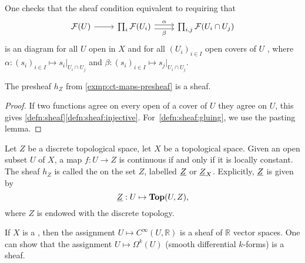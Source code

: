 \begin{rmk}\label{rmk:sheafs-as-equalizers}
    One checks that the sheaf condition equivalent to requiring that
\[\begin{tikzcd}
	{\mathcal{F}(U)} & {\prod_i\mathcal{F}(U_i)} & {\prod_{i,j}\mathcal{F}(U_i \cap U_j)}
	\arrow[from=1-1, to=1-2]
	\arrow["\alpha", shift left, from=1-2, to=1-3]
	\arrow["\beta"', shift right, from=1-2, to=1-3]
\end{tikzcd}\]
    is an  diagram for all $U$ open in $X$ and for all $(U_i)_{i \in I}$ open covers of $U$ , where $\alpha: (s_i)_{i \in I} \mapsto s_i|_{U_i \cap U_j}$ and $\beta: (s_i)_{i \in I} \mapsto s_j|_{U_i \cap U_j}$.
\end{rmk}

\begin{lem} \label{lem:ct-maps-sheaf}
    The presheaf $h_Z$ from \cref{exmp:ct-maps-presheaf} is a sheaf.
\end{lem}
\begin{proof}
    If two functions agree on every open of a cover of $U$ they agree on $U$, this gives \cref{defn:sheaf}\cref{defn:sheaf:injective}. For~\cref{defn:sheaf:gluing}, we use the pasting lemma.
\end{proof}

\begin{exmp}
    Let $Z$ be a discrete topological space, let $X$ be a topological space. Given an open subset $U$ of $X$, a map $f: U \to Z$ is continuous if and only if it is locally constant. The sheaf $h_Z$ is called the  on the set $Z$, labelled $\underline{Z}$ or $\underline{Z}_X$.
    Explicitly, \(\underline{Z}\) is given by
    \[ \constSheaf{Z} \colon U \mapsto \cont(U,Z)\text{,} \]
    where \(Z\) is endowed with the discrete topology.
\end{exmp}

\begin{exmp}
    If $X$ is a , then the assignment $U \mapsto C^\infty(U, \mathbb{R})$ is a sheaf of $\mathbb{R}$ vector spaces. One can show that the assignment $U \mapsto \Omega^k(U)$ (smooth differential $k$-forms) is a sheaf.
\end{exmp}

